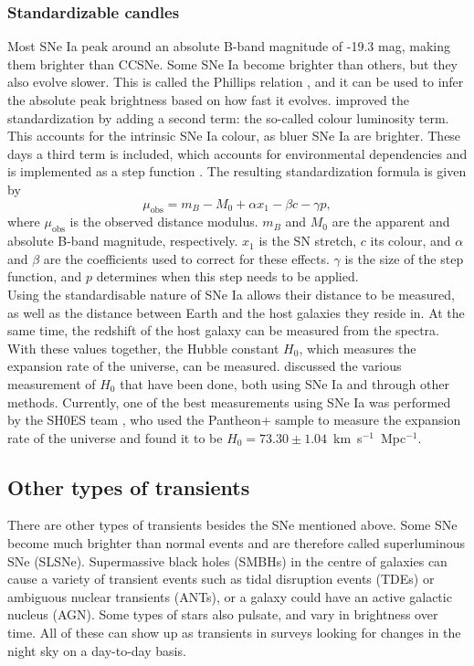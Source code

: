 \documentclass[a4paper,oneside,12pt, class=Latex/Classes/PhDthesisPSnPDF, crop=false]{standalone}
\begin{document}
\subsubsection{Standardizable candles}
\label{Standard_candle}
Most SNe Ia peak around an absolute B-band magnitude of -19.3 mag, making them brighter than CCSNe. Some SNe Ia become brighter than others, but they also evolve slower. This is called the Phillips relation \citep{phillips_rel}, and it can be used to infer the absolute peak brightness based on how fast it evolves. \citet{Tripp_colour_rel} improved the standardization by adding a second term: the so-called colour luminosity term. This accounts for the intrinsic SNe Ia colour, as bluer SNe Ia are brighter. These days a third term is included, which accounts for environmental dependencies and is implemented as a step function \citep{Kelly_mass_step, Sullivan_mass_step}. The resulting standardization formula is given by
\begin{equation}
    \mu_\text{obs} = m_B - M_0 + \alpha x_1 - \beta c - \gamma p,
\end{equation}
where $\mu_\text{obs}$ is the observed distance modulus. $m_B$ and $M_0$ are the apparent and absolute B-band magnitude, respectively. $x_1$ is the SN stretch, $c$ its colour, and $\alpha$ and $\beta$ are the coefficients used to correct for these effects. $\gamma$ is the size of the step function, and $p$ determines when this step needs to be applied.\\

Using the standardisable nature of SNe Ia allows their distance to be measured, as well as the distance between Earth and the host galaxies they reside in. At the same time, the redshift of the host galaxy can be measured from the spectra. With these values together, the Hubble constant $H_0$, which measures the expansion rate of the universe, can be measured. \citet{Hubble_tension_overview} discussed the various measurement of $H_0$ that have been done, both using SNe Ia and through other methods. Currently, one of the best measurements using SNe Ia was performed by the SH0ES team \citep{SH0ES}, who used the Pantheon+ sample \citep{Pantheon+} to measure the expansion rate of the universe and found it to be $H_0 = 73.30 \pm 1.04$~km~s$^{-1}$~Mpc$^{-1}$.


\subsection{Other types of transients}
\label{Other_trans}
There are other types of transients besides the SNe mentioned above. Some SNe become much brighter than normal events and are therefore called superluminous SNe (SLSNe). Supermassive black holes (SMBHs) in the centre of galaxies can cause a variety of transient events such as tidal disruption events (TDEs) or ambiguous nuclear transients (ANTs), or a galaxy could have an active galactic nucleus (AGN). Some types of stars also pulsate, and vary in brightness over time. All of these can show up as transients in surveys looking for changes in the night sky on a day-to-day basis.
\end{document}
